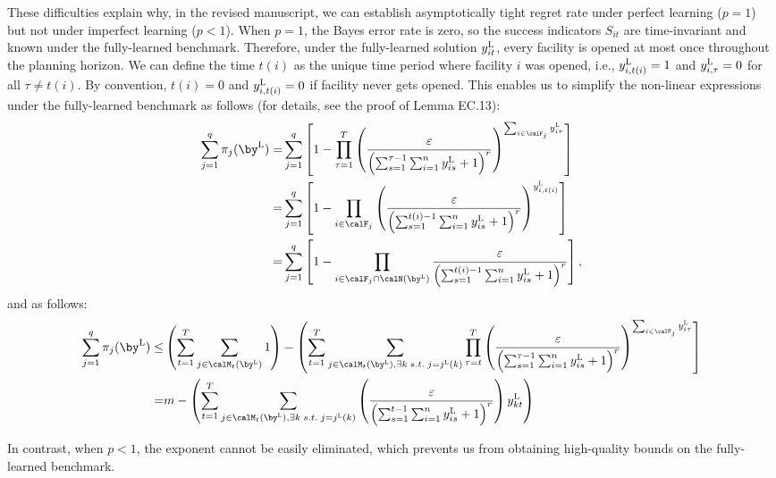 \documentclass[11pt]{article}
\begin{document}
These difficulties explain why, in the revised manuscript, we can establish asymptotically tight regret rate under perfect learning ($p=1$) but not under imperfect learning ($p<1$). When $p=1$, the Bayes error rate is zero, so the success indicators $S_{it}$ are time-invariant and known under the fully-learned benchmark. Therefore, under the fully-learned solution $y^{\textsc{L}}_{it}$, every facility is opened at most once throughout the planning horizon. We can define the time $t(i)$ as the unique time period where facility $i$ was opened, i.e., $y^{\textsc{L}}_{i,t(i)}=1$ and $y^{\textsc{L}}_{i,\tau}=0$ for all $\tau\neq t(i)$. By convention, $t(i)=0$ and $y^{\textsc{L}}_{i,t(i)}=0$ if facility never gets opened. This enables us to simplify the non-linear expressions under the fully-learned benchmark as follows (for details, see the proof of Lemma EC.13):
\begin{align*}
    \sum_{j=1}^q\pi_{j}(\by^{\textsc{L}})
     =&\sum_{j=1}^q \left[1-\prod_{\tau=1}^T \left(\frac{\varepsilon}{\left(\sum_{s=1}^{\tau-1}\sum_{i=1}^n y^{\textsc{L}}_{is}+1\right)^r}\right)^{\sum_{i \in \calF_j} y^{\textsc{L}}_{i\tau}}\right]\\
     =&\sum_{j=1}^q \left[1-\prod_{i \in \calF_j} \left(\frac{\varepsilon}{\left(\sum_{s=1}^{t(i)-1}\sum_{i=1}^n y^{\textsc{L}}_{is}+1\right)^r}\right)^{y^{\textsc{L}}_{i,t(i)}}\right]\\
     =&\sum_{j=1}^q \left[1-\prod_{i \in \calF_j\cap\calN(\by^{\textsc{L}})} \frac{\varepsilon}{\left(\sum_{s=1}^{t(i)-1}\sum_{i=1}^n y^{\textsc{L}}_{is}+1\right)^r}\right],
\end{align*}
and as follows:
\begin{align*}
    \sum_{j=1}^q \pi_{j}(\by^{\textsc{L}})
    \leq &\left(\sum_{t=1}^T\sum_{j \in \calM_t(\by^{\textsc{L}})} 1\right)-\left(\sum_{t=1}^T\sum_{j \in \calM_t(\by^{\textsc{L}}), \exists k\;s.t.\;j=j^{\textsc{L}}(k)}\prod_{\tau=t}^T \left(\frac{\varepsilon}{\left(\sum_{s=1}^{\tau-1}\sum_{i=1}^n y^{\textsc{L}}_{is}+1\right)^r}\right)^{\sum_{i \in \calF_j} y^{\textsc{L}}_{i\tau}}\right]\\
    =& m-\left(\sum_{t=1}^T\sum_{j \in \calM_t(\by^{\textsc{L}}), \exists k\;s.t.\;j=j^{\textsc{L}}(k)} \left(\frac{\varepsilon}{\left(\sum_{s=1}^{t-1}\sum_{i=1}^n y^{\textsc{L}}_{is}+1\right)^r}\right)y^{\textsc{L}}_{kt}\right)
\end{align*}

In contrast, when $p<1$, the exponent cannot be easily eliminated, which prevents us from obtaining high-quality bounds on the fully-learned benchmark.
\end{document}
